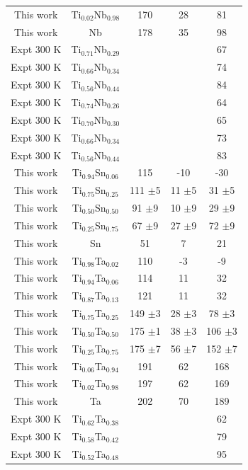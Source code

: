 \begin{longtable}[H]{ c c c c c}
	This work & Ti$_{0.02}$Nb$_{0.98}$ & 170 & 28 & 81\\
	This work & Nb & 178 & 35 & 98\\
	Expt 300 K \cite{Ozaki2004} & Ti$_{0.71}$Nb$_{0.29}$ & & & 67\\
	Expt 300 K \cite{Ozaki2004} & Ti$_{0.66}$Nb$_{0.34}$ & & & 74\\
	Expt 300 K \cite{Ozaki2004} & Ti$_{0.56}$Nb$_{0.44}$ & & & 84\\
	Expt 300 K \cite{Boyer1994} & Ti$_{0.74}$Nb$_{0.26}$ & & & 64\\
	Expt 300 K \cite{Boyer1994} & Ti$_{0.70}$Nb$_{0.30}$ & & & 65\\
	Expt 300 K \cite{Boyer1994} & Ti$_{0.66}$Nb$_{0.34}$ & & & 73\\
	Expt 300 K \cite{Boyer1994} & Ti$_{0.56}$Nb$_{0.44}$ & & & 83\\
	This work & Ti$_{0.94}$Sn$_{0.06}$ & 115 & -10 & -30\\
	This work & Ti$_{0.75}$Sn$_{0.25}$ & 111 $\pm$5 & 11 $\pm$5 & 31 $\pm$5\\
	This work & Ti$_{0.50}$Sn$_{0.50}$ & 91 $\pm$9 & 10 $\pm$9 & 29 $\pm$9\\
	This work & Ti$_{0.25}$Sn$_{0.75}$ & 67 $\pm$9 & 27 $\pm$9 & 72 $\pm$9\\
	This work & Sn & 51 & 7 & 21\\
	This work & Ti$_{0.98}$Ta$_{0.02}$ & 110 & -3 & -9\\
	This work & Ti$_{0.94}$Ta$_{0.06}$ & 114 & 11 & 32\\
	This work & Ti$_{0.87}$Ta$_{0.13}$ & 121 & 11 & 32\\
	This work & Ti$_{0.75}$Ta$_{0.25}$ & 149 $\pm$3 & 28 $\pm$3 & 78 $\pm$3\\
	This work & Ti$_{0.50}$Ta$_{0.50}$ & 175 $\pm$1 & 38 $\pm$3 & 106 $\pm$3\\
	This work & Ti$_{0.25}$Ta$_{0.75}$ & 175 $\pm$7 & 56 $\pm$7 & 152 $\pm$7\\
	This work & Ti$_{0.06}$Ta$_{0.94}$ & 191 & 62 & 168\\
	This work & Ti$_{0.02}$Ta$_{0.98}$ & 197 & 62 & 169\\
	This work & Ta & 202 & 70 & 189\\
	Expt 300 K \cite{Fedotov1985} & Ti$_{0.62}$Ta$_{0.38}$ & & & 62\\
	Expt 300 K \cite{Fedotov1985} & Ti$_{0.58}$Ta$_{0.42}$ & & & 79\\
	Expt 300 K \cite{Fedotov1985} & Ti$_{0.52}$Ta$_{0.48}$ & & & 95\\

\end{longtable}
